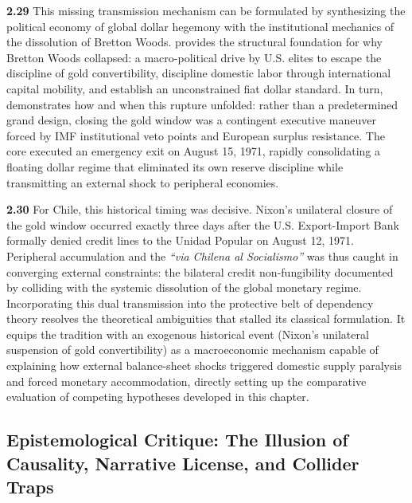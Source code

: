 \textbf{2.29} This missing transmission mechanism can be formulated by synthesizing the political economy 
of global dollar hegemony with the institutional mechanics of the dissolution of Bretton 
Woods. \citet{Vernengo2021} provides the structural foundation for why Bretton Woods collapsed: a macro-political drive by U.S. elites to escape the discipline of gold convertibility, discipline domestic labor through international capital mobility, and establish an unconstrained fiat dollar standard. In turn, \citet{Zoeller2019} demonstrates how and when this rupture unfolded: rather than a predetermined grand design, closing the gold window was a contingent executive maneuver forced by IMF institutional veto points and European surplus resistance. The core executed an emergency exit on August 15, 1971, rapidly consolidating a floating dollar regime that eliminated its own reserve discipline while transmitting an external shock to peripheral economies.

\textbf{2.30} For Chile, this historical timing was decisive. Nixon's unilateral closure of the gold window 
occurred exactly three days after the U.S. Export-Import Bank formally denied credit lines to the Unidad Popular on August 12, 1971. Peripheral accumulation and the \textit{``via Chilena al Socialismo''} was thus caught in converging external constraints: the bilateral credit non-fungibility documented by \citet{Stallings1978} colliding with the systemic dissolution of the global monetary regime. Incorporating this dual transmission into the protective belt of dependency theory resolves the theoretical ambiguities that stalled its classical formulation. It equips the tradition with an exogenous historical event (Nixon's unilateral suspension of gold convertibility) as a macroeconomic mechanism capable of explaining how external balance-sheet shocks triggered domestic supply paralysis and forced monetary accommodation, directly setting up the comparative evaluation of competing hypotheses developed in this chapter.  

\subsection{Epistemological Critique: The Illusion of Causality, Narrative License, and Collider Traps}
\label{sec:epistemological_critique}

